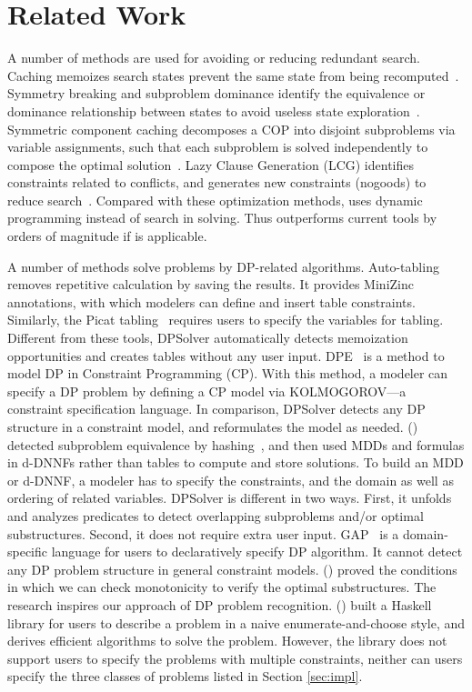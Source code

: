 \section{Related Work}
    
A number of methods are used for avoiding or reducing redundant search.
Caching memoizes search states prevent the same state from being recomputed~\cite{Smith2005}. 
Symmetry breaking and subproblem dominance identify the equivalence or dominance relationship between states to avoid useless state  exploration~\cite{Gent2006,chu2012exploiting}. Symmetric component caching decomposes a COP into disjoint subproblems via variable assignments, such that each subproblem is solved independently to compose the optimal solution~\cite{kitching2007symmetric}. 
Lazy Clause Generation (LCG) identifies constraints related to conflicts, and generates new constraints (nogoods) to reduce search~\cite{ohrimenko2009propagation}.
Compared with these optimization methods, \tool uses dynamic programming instead of search in solving. Thus \tool outperforms current tools by orders of magnitude if is applicable.

A number of methods solve problems by DP-related algorithms. Auto-tabling~\cite{dekker2017auto} removes repetitive calculation by saving the results. It provides MiniZinc annotations, with which modelers can define and insert table constraints. Similarly, the Picat tabling~\cite{zhou2015constraint} requires users to specify the variables for tabling. Different from these tools, DPSolver automatically detects memoization opportunities and creates tables without any user input.
DPE~\cite{prestwich2018towards} is a method to model DP in Constraint Programming (CP). With this method, a modeler can specify a DP problem by defining a CP model via KOLMOGOROV---a constraint specification language. In comparison, DPSolver detects any DP structure in a constraint model, and reformulates the model as needed.
\citeauthor{de2019compiling} (\citeyear{de2019compiling}) detected subproblem equivalence by hashing~\cite{chu2012exploiting}, and then used MDDs and formulas in d-DNNFs rather than tables to compute and store solutions. To build an MDD or d-DNNF, a modeler has to specify the constraints, and the domain as well as ordering of related variables. DPSolver is different in two ways. First, it unfolds and analyzes predicates to detect overlapping subproblems and/or optimal substructures. Second, it does not require extra user input.
GAP~\cite{Sauthoff2011Bellman} is a domain-specific language for users to declaratively specify DP algorithm. It cannot detect any DP problem structure in general constraint models.
\citeauthor{Moor1994Categories} (\citeyear{Moor1994Categories}) proved the conditions in which we can check monotonicity to verify the optimal substructures. The research inspires our approach of DP problem recognition.
\citeauthor{Morihata2014Dynamic} (\citeyear{Morihata2014Dynamic}) built a Haskell library for users to describe a problem in a naive enumerate-and-choose style, and derives efficient algorithms to solve the problem. However, the library does not support users to specify the problems with multiple constraints, neither can users specify the three classes of problems listed in Section \ref{sec:impl}.
